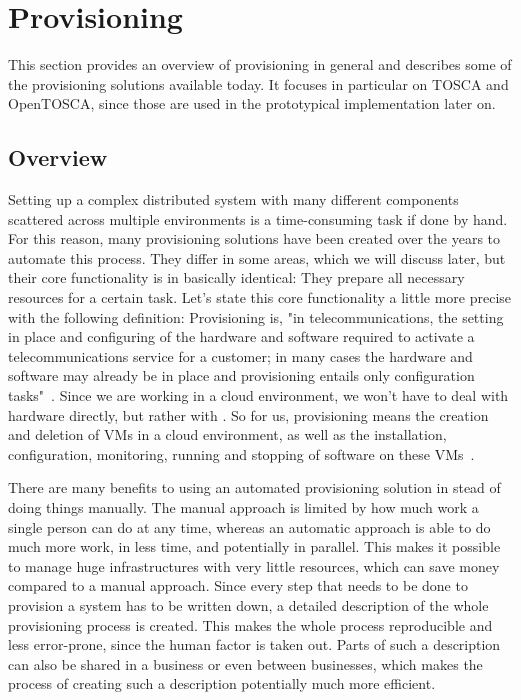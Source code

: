 \section{Provisioning}
\label{fundamentals:provisioning}

This section provides an overview of provisioning in general and describes some of the provisioning solutions available today.
It focuses in particular on TOSCA and OpenTOSCA, since those are used in the prototypical implementation later on.

\subsection{Overview}

Setting up a complex distributed system with many different components scattered across multiple environments is a time-consuming task if done by hand.
For this reason, many provisioning solutions have been created over the years to automate this process.
They differ in some areas, which we will discuss later, but their core functionality is in basically identical: They prepare all necessary resources for a certain task.
Let's state this core functionality a little more precise with the following definition: Provisioning is, "in telecommunications, the setting in place and configuring of the hardware and software required to activate a telecommunications service for a customer; in many cases the hardware and software may already be in place and provisioning entails only configuration tasks"~\autocite{def:provisioning}.
Since we are working in a cloud environment, we won't have to deal with hardware directly, but rather with .
So for us, provisioning means the creation and deletion of VMs in a cloud environment, as well as the installation, configuration, monitoring, running and stopping of software on these VMs~\autocite{provisioning:architecture}.

There are many benefits to using an automated provisioning solution in stead of doing things manually.
The manual approach is limited by how much work a single person can do at any time, whereas an automatic approach is able to do much more work, in less time, and potentially in parallel.
This makes it possible to manage huge infrastructures with very little resources, which can save money compared to a manual approach.
Since every step that needs to be done to provision a system has to be written down, a detailed description of the whole provisioning process is created.
This makes the whole process reproducible and less error-prone, since the human factor is taken out.
Parts of such a description can also be shared in a business or even between businesses, which makes the process of creating such a description potentially much more efficient.

